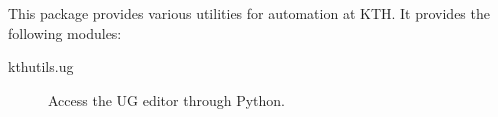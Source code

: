 This package provides various utilities for automation at KTH.
It provides the following modules:
\begin{description}
  \item[kthutils.ug] Access the UG editor through Python.
\end{description}
